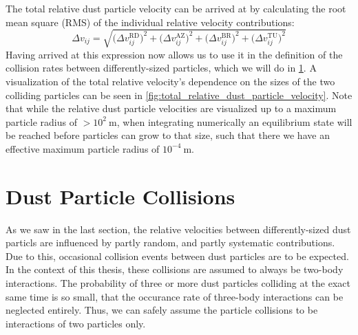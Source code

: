         The total relative dust particle velocity can be arrived at by calculating the 
        root mean square (RMS) of the individual relative velocity contributions:
        \begin{equation}
            \Delta v_{ij}
                = \sqrt{
                    \big(\Delta v^\text{RD}_{ij}\big)^2
                    + \big(\Delta v^\text{AZ}_{ij}\big)^2
                    + \big(\Delta v^\text{BR}_{ij}\big)^2
                    + \big(\Delta v^\text{TU}_{ij}\big)^2
                }
        \end{equation}
        Having arrived at this expression now allows us to use it in the definition of the 
        collision rates between differently-sized particles, which we will do in 
        \cref{sec:dust_particle_collisions}. 
        A visualization of the total relative velocity's dependence on the sizes of the
        two colliding particles can be seen in \cref{fig:total_relative_dust_particle_velocity}. 
        Note that while the relative dust particle velocities are visualized up to a maximum 
        particle radius of $>10^2\ \text{m}$, when integrating numerically an equilibrium state 
        will be reached before particles can grow to that size, such that there we have an 
        effective maximum particle radius of $10^{-4}\ \text{m}$.

        
        


\clearpage\section{Dust Particle Collisions}
\label{sec:dust_particle_collisions}

    As we saw in the last section, the relative velocities between differently-sized dust particls 
    are influenced by partly random, and partly systematic contributions. 
    Due to this, occasional collision events between dust particles are to be expected. \\ 

    In the context of this thesis, these collisions are assumed to always be two-body 
    interactions. The probability of three or more dust particles colliding at the exact same time
    is so small, that the occurance rate of three-body interactions can be neglected entirely.
    Thus, we can safely assume the particle collisions to be interactions of two particles only.

